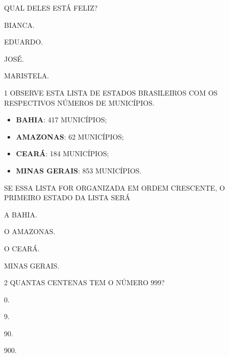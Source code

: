 QUAL DELES ESTÁ FELIZ?

\begin{escolha}[itemsep=0pt]
\item BIANCA.

\item EDUARDO.

\item JOSÉ.

\item MARISTELA.
\end{escolha}




\num{1} OBSERVE ESTA LISTA DE ESTADOS BRASILEIROS COM OS RESPECTIVOS NÚMEROS DE MUNICÍPIOS.

\begin{itemize}
  \item \textbf{BAHIA}: 417 MUNICÍPIOS;
  \item \textbf{AMAZONAS}: 62 MUNICÍPIOS;
  \item \textbf{CEARÁ}: 184 MUNICÍPIOS;
  \item \textbf{MINAS GERAIS}: 853 MUNICÍPIOS.
\end{itemize}

SE ESSA LISTA FOR ORGANIZADA EM ORDEM CRESCENTE, O PRIMEIRO ESTADO DA LISTA SERÁ

\begin{escolha}[itemsep=0pt]
\item A BAHIA.

\item O AMAZONAS.

\item O CEARÁ.

\item MINAS GERAIS.
\end{escolha}

\num{2} QUANTAS CENTENAS TEM O NÚMERO 999?

\begin{escolha}[itemsep=0pt]
\item 0.

\item 9.

\item 90.

\item 900.
\end{escolha}

